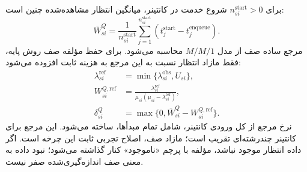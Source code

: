 برای $n_{si}^{\mathrm{start}}>0$ شروع خدمت در کانتینر، میانگین انتظار مشاهده‌شده چنین است:
\begin{equation}
 \overline W_{si}^Q=\frac{1}{n_{si}^{\mathrm{start}}}
 \sum_{j=1}^{n_{si}^{\mathrm{start}}}
 (t_j^{\mathrm{start}}-t_j^{\mathrm{enqueue}}).
 \label{eq:queue-measurement}
\end{equation}
مرجع ساده صف از مدل $M/M/1$ محاسبه می‌شود. برای حفظ مؤلفه صف روش پایه، فقط مازاد انتظار نسبت به این مرجع به هزینه ثابت افزوده می‌شود:
\begin{align}
 \lambda_{si}^{\mathrm{ref}}&=\min\{\lambda_{si}^{\mathrm{obs}},U_{si}\},\\
 W_{si}^{Q,\mathrm{ref}}&=
 \frac{\lambda_{si}^{\mathrm{ref}}}
      {\mu_{si}(\mu_{si}-\lambda_{si}^{\mathrm{ref}})},\\
 \delta^Q_{si}&=\max\{0,\overline W_{si}^Q-W_{si}^{Q,\mathrm{ref}}\}.
 \label{eq:queue-residual}
\end{align}
نرخ مرجع از کل ورودی کانتینر، شامل تمام مبدأها، ساخته می‌شود. این مرجع برای کانتینر چندرشته‌ای تقریب است؛ مازاد صف، اصلاح تجربی ثابت این چرخه است. اگر داده انتظار موجود نباشد، مؤلفه با پرچم «ناموجود» کنار گذاشته می‌شود؛ نبود داده به معنی صف اندازه‌گیری‌شده صفر نیست.

